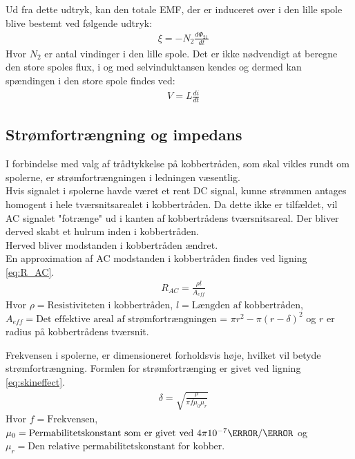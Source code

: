 Ud fra dette udtryk, kan den totale EMF, der er induceret over i den lille spole blive bestemt ved følgende udtryk:
\begin{align}
	&\xi = -N_2\frac{d\Phi_{21}}{dt} \label{eq:emf_lille_spole}
\end{align}
Hvor $N_2$ er antal vindinger i den lille spole.
Det er ikke nødvendigt at beregne den store spoles flux, i og med selvinduktansen kendes og dermed kan spændingen i den store spole findes ved:
\begin{align}
	&V = L\frac{di}{dt} \label{eq:ldidt}
\end{align}
\subsection{Strømfortrængning  og impedans}\label{Sec_skineff.}
I forbindelse med valg af trådtykkelse på kobbertråden, som skal vikles rundt om spolerne, er strømfortrængningen i ledningen væsentlig.\\
Hvis signalet i spolerne havde været et rent DC signal, kunne strømmen antages homogent i hele tværsnitsarealet i kobbertråden.
Da dette ikke er tilfældet, vil AC signalet "fotrænge" ud i kanten af kobbertrådens tværsnitsareal. 
Der bliver derved skabt et hulrum inden i kobbertråden. \\
Herved bliver modstanden i kobbertråden ændret.\\
En approximation af AC modstanden i kobbertråden findes ved ligning \ref{eq:R_AC}.
\begin{align}
	& R_{AC}=\frac{\rho l}{A_{eff}} \label{eq:R_AC}
\end{align}
Hvor $ \rho = \text{Resistiviteten i kobbertråden}$, $l = \text{Længden af kobbertråden}$, $A_{eff} = \text{Det effektive areal af strømfortrængningen = $\pi r^2-\pi(r-\delta)^2$}$ og $r$ er radius på kobbertrådens tværsnit.

Frekvensen i spolerne, er dimensioneret forholdsvis høje, hvilket vil betyde strømfortrængning.
Formlen for strømfortrænging er givet ved ligning \ref{eq:skineffect}.
\begin{align}
	& \delta = \sqrt{\frac{\rho}{\pi f\mu_0\mu_r}} \label{eq:skineffect}
\end{align}
Hvor $f = \text{Frekvensen}$, $\mu_0 = \text{Permabilitetskonstant som er givet ved $4\pi 10^{-7}\henry/\meter$}$ og $\mu_r = \text{Den relative permabilitetskonstant for kobber}$.


